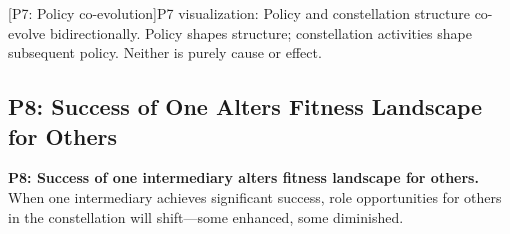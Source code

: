 \documentclass[../main.tex]{subfiles}
\begin{document}
\begin{center}
[P7: Policy co-evolution]{P7 visualization: Policy and constellation structure co-evolve bidirectionally. Policy shapes structure; constellation activities shape subsequent policy. Neither is purely cause or effect.}
\end{center}

\vspace{0.5cm}
\subsection{P8: Success of One Alters Fitness Landscape for Others}

\begin{propositionbox}
\textbf{P8: Success of one intermediary alters fitness landscape for others.}\\[3pt]
When one intermediary achieves significant success, role opportunities for others in the constellation will shift---some enhanced, some diminished.
\end{propositionbox}
\end{document}

